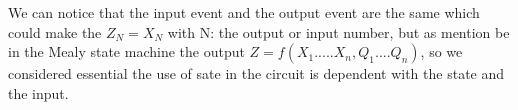 We can notice that the input event and the output event are the same which could make the $Z_N=X_N$ with N: the output or input number, but as mention be in the Mealy state machine the output $Z=f(X_1.....X_n,Q_1....Q_n)$, so we considered essential the use of sate in the circuit is dependent with the state and the input. 

















%
%
%
%
%	
%	 
%    
%    
%
